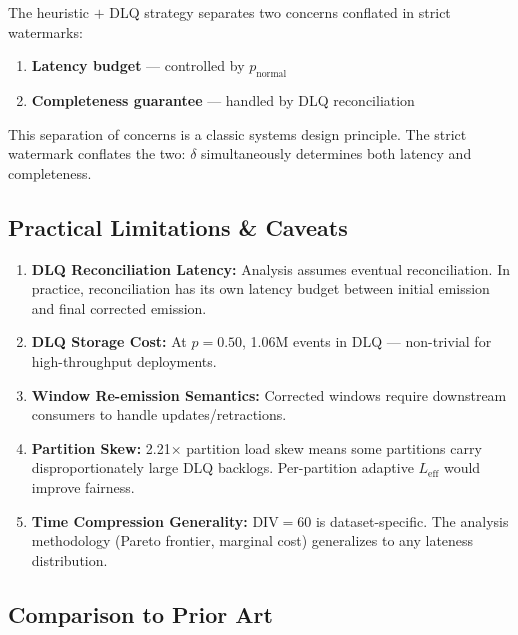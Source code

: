 \documentclass[11pt,a4paper]{article}
\newcommand{\Leff}{L_{\text{eff}}}
\begin{document}
The heuristic $+$ DLQ strategy separates two concerns conflated in strict watermarks:
\begin{enumerate}[leftmargin=*, itemsep=2pt]
  \item \textbf{Latency budget} --- controlled by $p_{\text{normal}}$
  \item \textbf{Completeness guarantee} --- handled by DLQ reconciliation
\end{enumerate}
This separation of concerns is a classic systems design principle.
The strict watermark conflates the two: $\delta$ simultaneously determines both latency and completeness.

\subsection{Practical Limitations \& Caveats}

\begin{enumerate}[leftmargin=*, itemsep=2pt]
  \item \textbf{DLQ Reconciliation Latency:} Analysis assumes eventual reconciliation. In practice, reconciliation has its own latency budget between initial emission and final corrected emission.
  \item \textbf{DLQ Storage Cost:} At $p{=}0.50$, 1.06M events in DLQ --- non-trivial for high-throughput deployments.
  \item \textbf{Window Re-emission Semantics:} Corrected windows require downstream consumers to handle updates/retractions.
  \item \textbf{Partition Skew:} 2.21$\times$ partition load skew means some partitions carry disproportionately large DLQ backlogs. Per-partition adaptive $\Leff$ would improve fairness.
  \item \textbf{Time Compression Generality:} DIV$=$60 is dataset-specific. The analysis methodology (Pareto frontier, marginal cost) generalizes to any lateness distribution.
\end{enumerate}

\subsection{Comparison to Prior Art}
\end{document}
